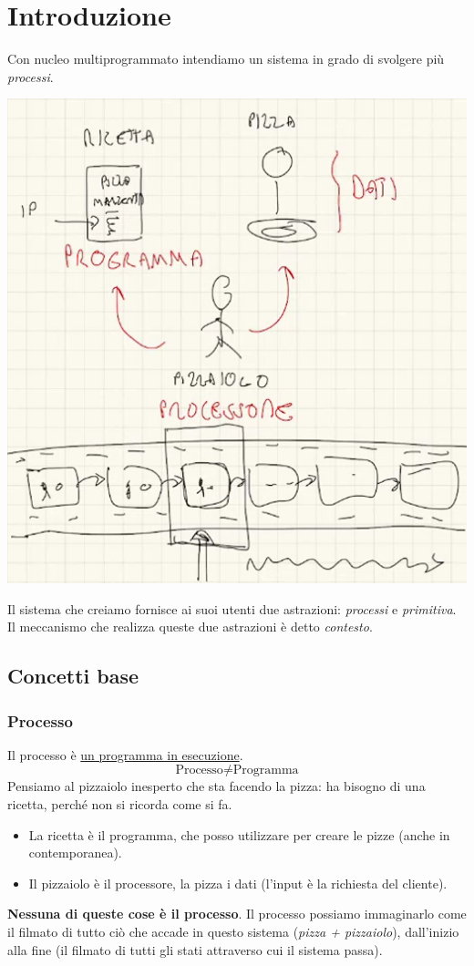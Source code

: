 \chapter{Introduzione}
Con nucleo multiprogrammato intendiamo un sistema in grado di svolgere più \emph{processi}.
\begin{center}\includegraphics[scale=.80]{img/124.PNG}\end{center}
Il sistema che creiamo fornisce ai suoi utenti due astrazioni: \emph{processi} e \emph{primitiva}. Il meccanismo che realizza queste due astrazioni è detto \emph{contesto}.
\section{Concetti base}
\subsection{Processo} Il processo è \underline{un programma in esecuzione}. 
\[\text{Processo} \neq \text{Programma}\]
Pensiamo al pizzaiolo inesperto che sta facendo la pizza: ha bisogno di una ricetta, perché non si ricorda come si fa.
\begin{itemize}
	\item La ricetta è il programma, che posso utilizzare per creare le pizze (anche in contemporanea).
	\item Il pizzaiolo è il processore, la pizza i dati (l'input è la richiesta del cliente).
\end{itemize}
\textbf{Nessuna di queste cose è il processo}. Il processo possiamo immaginarlo come il filmato di tutto ciò che accade in questo sistema (\emph{pizza + pizzaiolo}), dall'inizio alla fine (il filmato di tutti gli stati attraverso cui il sistema passa).
